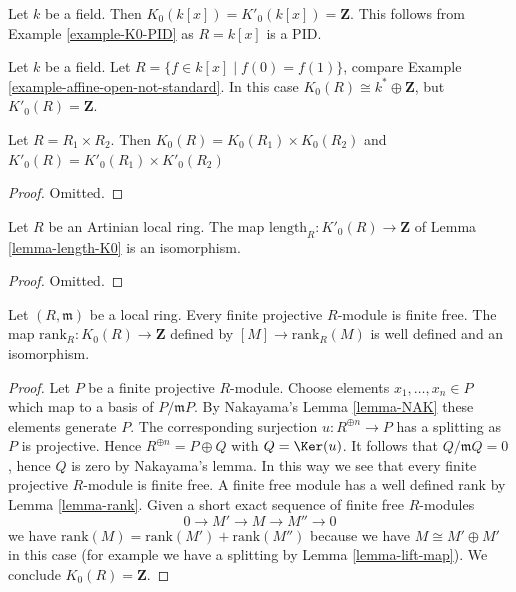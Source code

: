 \begin{example}
\label{example-K0-polynomial-ring}
Let $k$ be a field. Then $K_0(k[x]) = K'_0(k[x]) = \mathbf{Z}$.
This follows from Example \ref{example-K0-PID} as
$R = k[x]$ is a PID.
\end{example}

\begin{example}
\label{example-K0-node}
Let $k$ be a field. Let $R = \{f \in k[x] \mid f(0) = f(1)\}$,
compare Example \ref{example-affine-open-not-standard}.
In this case $K_0(R) \cong k^* \oplus \mathbf{Z}$, but
$K'_0(R) = \mathbf{Z}$.
\end{example}

\begin{lemma}
\label{lemma-K0-product}
Let $R = R_1 \times R_2$. Then $K_0(R) = K_0(R_1) \times K_0(R_2)$
and $K'_0(R) = K'_0(R_1) \times K'_0(R_2)$
\end{lemma}

\begin{proof}
Omitted.
\end{proof}

\begin{lemma}
\label{lemma-K0prime-Artinian}
Let $R$ be an Artinian local ring.
The map $\text{length}_R : K'_0(R) \to \mathbf{Z}$
of Lemma \ref{lemma-length-K0} is an isomorphism.
\end{lemma}

\begin{proof}
Omitted.
\end{proof}

\begin{lemma}
\label{lemma-K0-local}
Let $(R, \mathfrak m)$ be a local ring. Every finite projective $R$-module
is finite free. The map $\text{rank}_R : K_0(R) \to \mathbf{Z}$
defined by $[M] \to \text{rank}_R(M)$ is well defined
and an isomorphism.
\end{lemma}

\begin{proof}
Let $P$ be a finite projective $R$-module. Choose elements
$x_1, \ldots, x_n \in P$ which map to a basis of $P/\mathfrak m P$.
By Nakayama's Lemma \ref{lemma-NAK} these elements generate $P$.
The corresponding surjection $u : R^{\oplus n} \to P$ has a splitting
as $P$ is projective. Hence $R^{\oplus n} = P \oplus Q$ with $Q = \Ker(u)$.
It follows that $Q/\mathfrak m Q = 0$, hence $Q$ is zero by
Nakayama's lemma. In this way we see that every finite projective
$R$-module is finite free.
A finite free module has a well defined rank by Lemma \ref{lemma-rank}.
Given a short exact sequence of finite free $R$-modules
$$
0 \to M' \to M \to M'' \to 0
$$
we have $\text{rank}(M) = \text{rank}(M') + \text{rank}(M'')$
because we have $M \cong M' \oplus M'$ in this case (for example
we have a splitting by Lemma \ref{lemma-lift-map}).
We conclude $K_0(R) = \mathbf{Z}$.
\end{proof}

